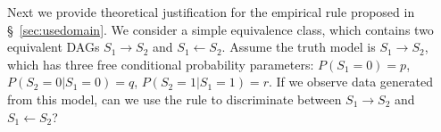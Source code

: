 \documentclass{edm_template}
\begin{document}
Next we provide theoretical justification for the empirical rule proposed in \S~\ref{sec:usedomain}.
%
We consider a simple equivalence class, which contains two equivalent DAGs $S_1\rightarrow S_2$ and $S_1\leftarrow S_2$.
Assume the truth model is $S_1\rightarrow S_2$, which has three free conditional probability parameters: $P(S_1=0)=p$, $P(S_2=0|S_1=0)=q$, $P(S_2=1|S_1=1)=r$.
If we observe data generated from this model, 
can we use the rule to discriminate between $S_1\rightarrow S_2$ and $S_1\leftarrow S_2$? %
\end{document}
